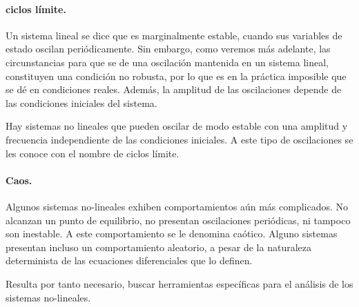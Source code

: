 \paragraph{ciclos límite.} Un sistema lineal se dice que es marginalmente estable, cuando sus variables de estado oscilan periódicamente. Sin embargo, como veremos más adelante, las circunstancias para que se de una oscilación mantenida en un sistema lineal, constituyen una condición no robusta, por lo que es en la práctica  imposible que se dé en condiciones reales. Además, la amplitud de las oscilaciones depende de las condiciones iniciales del sistema.

Hay sistemas no lineales que pueden oscilar de modo estable con una amplitud y frecuencia independiente de las condiciones iniciales. A este tipo de oscilaciones se les conoce con el nombre de ciclos límite. 

\paragraph{Caos.} Algunos sistemas no-lineales exhiben comportamientos aún más complicados. No alcanzan un punto de equilibrio, no presentan oscilaciones periódicas, ni tampoco son inestable. A este comportamiento se le denomina caótico. Alguno sistemas presentan incluso un comportamiento aleatorio, a pesar de la naturaleza determinista de las ecuaciones diferenciales que lo definen.


 Resulta por tanto necesario, buscar herramientas específicas para el análisis de los sistemas no-lineales.
